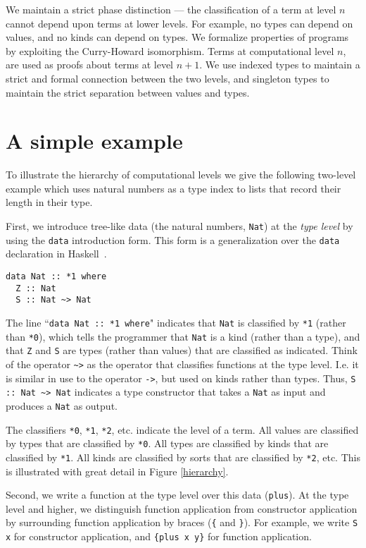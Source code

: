 \documentclass[11pt,twoside,A4]{llncs}
\begin{document}
We maintain a strict phase distinction ---
the classification of a term at level $n$ cannot depend upon terms at
lower levels. For example, no types can depend on values, and no kinds
can depend on types. 
We formalize properties of programs by exploiting the Curry-Howard
isomorphism. Terms at computational level $n$, are used
as proofs about terms at level $n+1$. We use indexed types
to maintain a strict and formal connection between the two levels,
and singleton types to maintain the strict separation between
values and types.


\section{A simple example} \label{simple}

To illustrate the hierarchy of computational levels we give the
following two-level example which uses natural numbers as a type
index to lists that record their length in their type.

First, we introduce tree-like data (the natural
numbers, {\tt Nat}) at the {\em type level} by using the {\tt data}
introduction form. This form is a generalization
over the \verb+data+ declaration in Haskell~\cite{peyton-jones:haskell98}. 


{\small
\begin{verbatim}
data Nat :: *1 where
  Z :: Nat
  S :: Nat ~> Nat
\end{verbatim}}

\noindent
The line ``\verb+data Nat :: *1 where+" indicates that
\verb+Nat+ is classified by \verb+*1+ (rather than \verb+*0+), which tells
the programmer that \verb+Nat+ is a kind (rather than a type), and 
that \verb+Z+ and \verb+S+ are types (rather than values) that are
classified as indicated.  Think of the operator \verb+~>+ as the
operator that classifies functions at the type level. I.e.
it is similar in use to the operator \verb+->+, but used on kinds rather
than types. Thus, \verb+S :: Nat ~> Nat+ indicates
a type constructor that takes a \verb+Nat+ as input and produces
a \verb+Nat+ as output.

The classifiers
\verb+*0+, \verb+*1+, \verb+*2+, etc. indicate the level of a term.
All values are classified by types that are classified by \verb+*0+. All types
are classified by kinds that are classified by \verb+*1+. All kinds are
classified by sorts that are classified by \verb+*2+, etc. This is illustrated
with great detail in Figure \ref{hierarchy}.

Second, we write a function at the type level over this data
({\tt plus}).  At the type level and higher, we distinguish
function application from constructor application by surrounding
function application by braces (\verb+{+ and \verb+}+). For example,
we write \verb+S x+ for constructor application,
and \verb+{plus x y}+ for function application.
\end{document}
